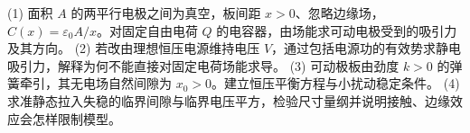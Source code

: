 (1) 面积 \(A\) 的两平行电极之间为真空，板间距 \(x>0\)、忽略边缘场，\(C(x)=\varepsilon_0A/x\)。对固定自由电荷 \(Q\) 的电容器，由场能求可动电极受到的吸引力及其方向。
(2) 若改由理想恒压电源维持电压 \(V\)，通过包括电源功的有效势求静电吸引力，解释为何不能直接对固定电荷场能求导。
(3) 可动极板由劲度 \(k>0\) 的弹簧牵引，其无电场自然间隙为 \(x_0>0\)。建立恒压平衡方程与小扰动稳定条件。
(4) 求准静态拉入失稳的临界间隙与临界电压平方，检验尺寸量纲并说明接触、边缘效应会怎样限制模型。
